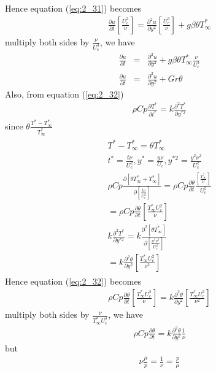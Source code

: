 \documentclass[11pt]{report}
\newcommand{\sps}{\\[0.2cm]}
\newcommand{\refn}[1]{(\ref{#1})}
\newcommand{\refx}[1]{\refn{eq:#1}}
\newcommand{\dsp}{\displaystyle}
\begin{document}
	Hence equation \refx{2_31} becomes
	\begin{eqnarray}
		\frac{\partial u}{\partial t}\left[\frac{U_c^3}{\nu}\right] = \frac{\partial^2 u}{\partial y^2}\left[\frac{U_c^3}{\nu}\right] + g\beta\theta T^*_\infty\label{eq:2_33}
	\end{eqnarray}
	multiply both sides by $\dsp\frac{\nu}{U_c^3}$, we have
	\begin{eqnarray}
		\frac{\partial u}{\partial t} &=& \frac{\partial^2 u}{\partial y^2} + g\beta\theta T^*_\infty\frac{\nu}{U_c^3}\sps
		\frac{\partial u}{\partial t} &=& \frac{\partial^2 u}{\partial y^2} + Gr\theta
	\end{eqnarray}
	Also, from equation \refx{2_32}
	\begin{eqnarray}
		\rho Cp \frac{\partial T^*}{\partial t^*} = k\frac{\partial^2 T^*}{\partial y^{*2}}
	\end{eqnarray}
	since $\dsp \theta  \frac{T^* - T^*_\infty}{T^*_\infty}$
	\begin{eqnarray*}
		\begin{gathered}
			T^* - T^*_\infty = \theta T^*_\infty\sps
			t^* = \frac{t\nu}{U_c^2}, y^* =\frac{y\nu}{U_c}, y^{*2}=\frac{y^2\nu^2}{U_c^2}\sps
			\rho Cp\frac{\partial\left[\theta T^*_\infty + T^*_\infty\right]}{\partial\left[\frac{t\nu}{U_c^2}\right]} = \rho Cp\frac{\partial\theta}{\partial t}\frac{\left[\frac{T^*_\infty}{\nu}\right]}{U_c^2}\sps
			= \rho Cp\frac{\partial\theta}{\partial t}\left[\frac{T^*_\infty U_c^2}{\nu}\right]\sps
			k\frac{\partial^2 T^*}{\partial y^{*2}} = k\frac{\partial^2\left[\theta T^*_\infty\right]}{\partial \left[\frac{y^2\nu^2}{U_c^2}\right]}\sps
			= k\frac{\partial^2 \theta}{\partial y^2}\left[\frac{T^*_\infty U_c^2}{\nu^2}\right]
		\end{gathered}
	\end{eqnarray*}
	Hence equation \refx{2_32} becomes
	\begin{eqnarray}
		\rho Cp\frac{\partial\theta}{\partial t}\left[\frac{T^*_\infty U_c^2}{\nu}\right] = k\frac{\partial^2\theta}{\partial y^2}\left[\frac{T^*_\infty U_c^2}{\nu^2}\right]
	\end{eqnarray}
	multiply both sides by $\dsp \frac{\nu}{T^*_\infty U_c^2}$, we have
	\begin{eqnarray}
		\rho Cp\frac{\partial\theta}{\partial t} = k\frac{\partial^2\theta}{\partial y^2}\frac{1}{\nu}\label{eq:2_38}
	\end{eqnarray}
	but
	\begin{eqnarray*}
		\nu \frac{\mu}{p}=\frac{1}{\nu}=\frac{p}{\mu}
	\end{eqnarray*}
\end{document}
